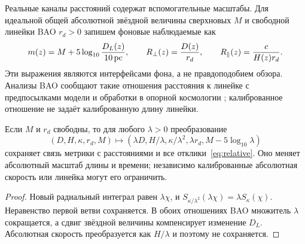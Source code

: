 \section{}\label{sec:calibration}
{Реальные каналы расстояний содержат вспомогательные масштабы. Для идеальной общей абсолютной звёздной величины сверхновых $M$ и свободной линейки BAO $r_d>0$ запишем фоновые наблюдаемые как}
\begin{equation}\label{eq:relative}
 m(z)=M+5\log_{10}\frac{D_L(z)}{10\,{\rm pc}},\qquad
 R_\perp(z)=\frac{D(z)}{r_d},\qquad R_\parallel(z)=\frac c{H(z)r_d}.
\end{equation}
{Эти выражения являются интерфейсами фона, а не правдоподобием обзора. Анализы BAO сообщают такие отношения расстояния к линейке с предпосылками модели и обработки в опорной космологии \cite{DESI}; калиброванное отношение не задаёт калиброванную длину линейки.}
\begin{proposition}\label{prop:scale}
{Если $M$ и $r_d$ свободны, то для любого $\lambda>0$ преобразование}
\begin{equation}\label{eq:scale}
 (D,H,\kappa,r_d,M)\longmapsto
 (\lambda D,H/\lambda,\kappa/\lambda^2,\lambda r_d,M-5\log_{10}\lambda)
\end{equation}
{сохраняет связь метрики с расстояниями и все отклики~\eqref{eq:relative}. Оно меняет абсолютный масштаб длины и времени; независимо калиброванные абсолютная скорость или линейка могут его ограничить.}
\end{proposition}
\begin{proof}
{Новый радиальный интеграл равен $\lambda\chi$, и $S_{\kappa/\lambda^2}(\lambda\chi)=\lambda S_\kappa(\chi)$. Неравенство первой ветви сохраняется. В обоих отношениях BAO множитель $\lambda$ сокращается, а сдвиг звёздной величины компенсирует изменение $D_L$. Абсолютная скорость преобразуется как $H/\lambda$ и поэтому не сохраняется.}
\end{proof}
